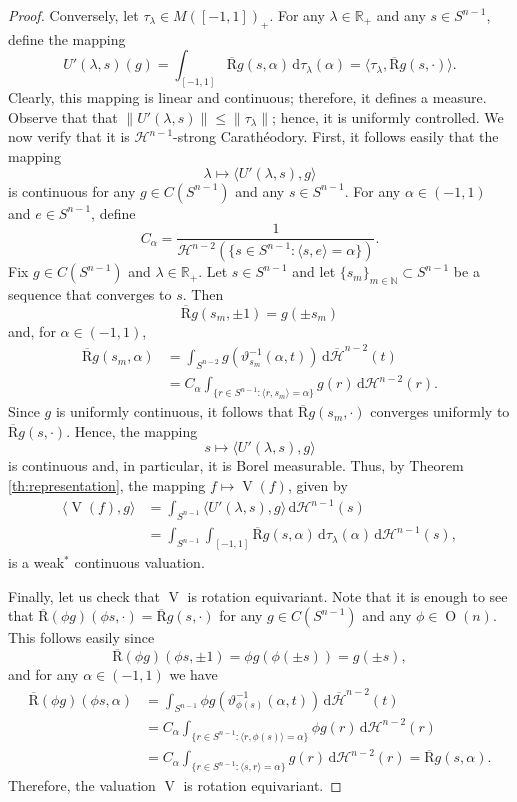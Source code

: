 \documentclass[11pt, a4paper]{amsart}
\renewcommand{\d}{\,\mathrm{d}}
\newcommand{\hn}{\mathcal H^{n-1}}
\newcommand{\hm}{\mathcal H^{n-2}}
\newcommand{\rp}{\mathbb R_{\scriptscriptstyle +}}
\newcommand{\sn}{{S^{n-1}}}
\newcommand{\sm}{S^{n-2}}
\newcommand{\on}{\operatorname{O}(n)}
\renewcommand{\d}{\,\mathrm{d}}
\newcommand{\oV}{\operatorname{V}}
\newcommand{\radon}{\operatorname{\overline R}}
\newcommand{\rhot}{\tau}
\begin{document}
\begin{proof}
\goodbreak
Conversely, let $\rhot_\lambda\in M([-1,1])_{\scriptscriptstyle +}$. For any $\lambda\in\rp$ and any $s\in\sn$, define the mapping
\[
     U'(\lambda,s)(g) =\int_{[-1,1]} \radon g (s, \alpha)\d \rhot_\lambda (\alpha)=\langle \rhot_\lambda, \radon g (s, \cdot)\rangle.
\]
Clearly, this mapping is linear and continuous; therefore, it defines a measure. Observe that that $\|U'(\lambda,s)\|\leq \|\rhot_\lambda\|$; hence, it is uniformly controlled. We now verify that it is $\mathcal{H}^{n-1}$-strong Carath\'eodory. First, it follows easily that the mapping
\[
    \lambda\mapsto \langle U'(\lambda,s),g\rangle
\]
is continuous for any $g\in C(\sn)$ and any $s\in \sn$. For any $\alpha\in(-1,1)$ and $e\in\sn$, define
\[
    C_\alpha=
    \frac{1}{\hm(\{s\in\sn:\langle s,e\rangle=\alpha\})}.
\] 
Fix $g\in C(\sn)$ and $\lambda\in\rp$. Let $s\in \sn$ and let $\{s_m\}_{m\in\mathbb{N}}\subset\sn$ be a sequence that converges to $s$. Then
\[
    \radon g (s_m, \pm 1)=g(\pm s_m)
\]
and, for $\alpha\in(-1,1)$,
\begin{align*}
   \radon g (s_m, \alpha)&=\int_{\sm}g(\vartheta^{-1}_{s_m}(\alpha,t))\d\overline{\mathcal{H}}^{n-2}(t)\\
    &=C_\alpha \int_{\{r\in\sn:\langle r,s_m\rangle=\alpha\}}g(r)\d\hm(r).
\end{align*} 
Since $g$ is uniformly continuous, it follows that $\radon g (s_m, \cdot)$ converges uniformly to $\radon g (s, \cdot)$. Hence, the mapping 
\[
    s\mapsto \langle U'(\lambda,s),g\rangle
\]
is continuous and, in particular, it is Borel measurable. Thus, by Theorem \ref{th:representation}, the mapping $f\mapsto \oV (f)$, given by
\begin{align*}
    \langle \oV(f),g\rangle &=\int_\sn \langle U'(\lambda,s),g\rangle \d \hn(s)\\
    &=\int_{\sn}\int_{[-1,1]} \radon g (s, \alpha)\d\rhot_\lambda(\alpha)\d\hn(s),
\end{align*}
is a weak$^*$ continuous valuation.

Finally, let us check that $\oV$ is rotation equivariant. Note that it is enough to see that $\radon (\phi g) (\phi s, \cdot)= \radon g (s, \cdot)$ for any $g\in C(\sn)$ and any $\phi\in\on$. This follows easily since
\[
   \radon (\phi g) (\phi s, \pm 1) =\phi g(\phi(\pm s))=g(\pm s),
\]
and for any $\alpha\in(-1,1)$ we have
\begin{align*}
   \radon (\phi g) (\phi s, \alpha)&=\int_{\sn}\phi g(\vartheta_{\phi(s)}^{-1}(\alpha,t))\d \overline{\mathcal{H}}^{n-2}(t)\\
    &=C_\alpha \int_{\{r\in\sn: \langle r,\phi(s)\rangle=\alpha\}}\phi g(r)\d \hm(r)\\
    &=C_\alpha \int_{\{r\in\sn:\langle s,r\rangle =\alpha\} }g(r)\d\hm(r)=\radon g (s, \alpha).
\end{align*}
Therefore, the valuation $\oV$ is rotation equivariant.
\end{proof}
\end{document}
